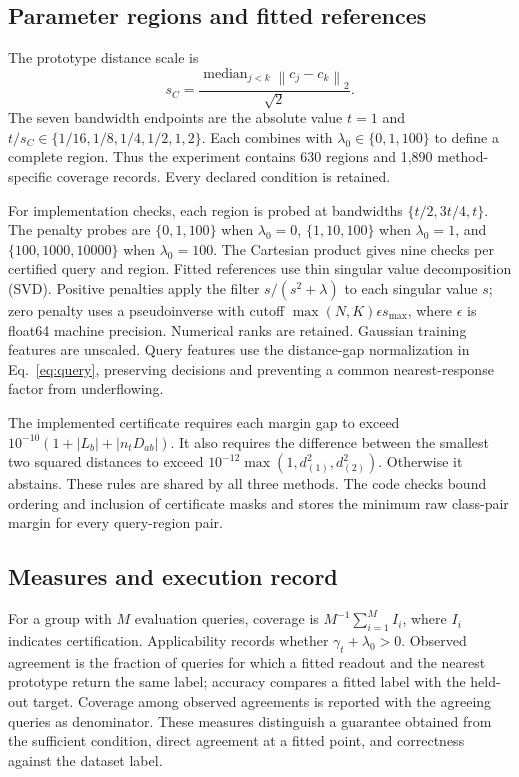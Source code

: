 \documentclass[preprint,12pt,authoryear]{elsarticle}
\newcommand{\norm}[1]{\left\lVert#1\right\rVert}
\begin{document}
\subsection{Parameter regions and fitted references}
The prototype distance scale is
\begin{equation}
 s_C=\frac{\operatorname{median}_{j<k}\norm{c_j-c_k}_2}{\sqrt{2}}.
 \label{eq:scale}
\end{equation}
The seven bandwidth endpoints are the absolute value $t=1$ and $t/s_C\in\{1/16,\allowbreak1/8,\allowbreak1/4,\allowbreak1/2,\allowbreak1,\allowbreak2\}$. Each combines with $\lambda_0\in\{0,1,100\}$ to define a complete region. Thus the experiment contains 630 regions and 1,890 method-specific coverage records. Every declared condition is retained.

For implementation checks, each region is probed at bandwidths $\{t/2,3t/4,t\}$. The penalty probes are $\{0,1,100\}$ when $\lambda_0=0$, $\{1,10,100\}$ when $\lambda_0=1$, and $\{100,1000,10000\}$ when $\lambda_0=100$. The Cartesian product gives nine checks per certified query and region. Fitted references use thin singular value decomposition (SVD). Positive penalties apply the filter $s/(s^2+\lambda)$ to each singular value $s$; zero penalty uses a pseudoinverse with cutoff $\max(N,K)\epsilon s_{\max}$, where $\epsilon$ is float64 machine precision. Numerical ranks are retained. Gaussian training features are unscaled. Query features use the distance-gap normalization in Eq.~\eqref{eq:query}, preserving decisions and preventing a common nearest-response factor from underflowing.

The implemented certificate requires each margin gap to exceed $10^{-10}(1+|L_b|+|n_tD_{ab}|)$. It also requires the difference between the smallest two squared distances to exceed $10^{-12}\max(1,d_{(1)}^2,d_{(2)}^2)$. Otherwise it abstains. These rules are shared by all three methods. The code checks bound ordering and inclusion of certificate masks and stores the minimum raw class-pair margin for every query-region pair.

\subsection{Measures and execution record}
For a group with $M$ evaluation queries, coverage is $M^{-1}\sum_{i=1}^M I_i$, where $I_i$ indicates certification. Applicability records whether $\gamma_t+\lambda_0>0$. Observed agreement is the fraction of queries for which a fitted readout and the nearest prototype return the same label; accuracy compares a fitted label with the held-out target. Coverage among observed agreements is reported with the agreeing queries as denominator. These measures distinguish a guarantee obtained from the sufficient condition, direct agreement at a fitted point, and correctness against the dataset label.
\end{document}
